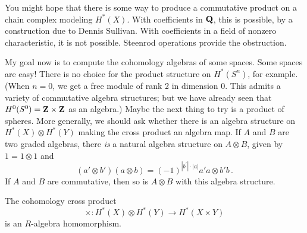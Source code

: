 You might hope that there is some way to produce a commutative product on 
a chain complex modeling $H^\ast(X)$. With coefficients in $\mathbf Q$, this is 
possible, by a construction due to Dennis Sullivan. 
With coefficients in a field of nonzero characteristic, it is not possible.
Steenrod operations provide the obstruction.

My goal now is to compute the cohomology algebras of some spaces. 
Some spaces are
easy! There is no choice for the product structure on $H^*(S^n)$, for example.
(When $n=0$, we get a free module of rank 2 in dimension 0. This admits
a variety of commutative algebra structures; but we have already seen that
$H^0(S^0)=\mathbf Z\times\mathbf Z$ as an algebra.) Maybe the next thing to try is a 
product of spheres. More generally, we should ask whether there is an 
algebra structure on $H^\ast(X)\otimes H^\ast(Y)$ making the cross product an
algebra map. If $A$ and $B$ are two graded algebras, there {\em is} a natural
algebra structure on $A\otimes B$, given by $1=1\otimes1$ and
\[
(a'\otimes b')(a\otimes b)=(-1)^{|b^\prime|\cdot|a|}a'a\otimes b'b\,.
\]
If $A$ and $B$ are commutative, then so is $A\otimes B$ with this algebra
structure. 
\begin{prop} The cohomology cross product
\[
\times:H^\ast(X)\otimes H^\ast(Y)\rightarrow H^\ast(X\times Y)
\]
is an $R$-algebra homomorphism.
\end{prop}
